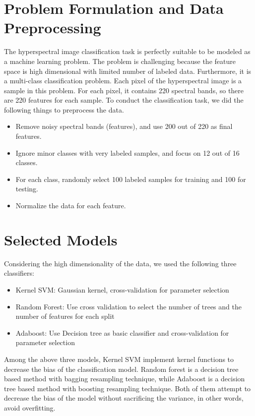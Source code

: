 \documentclass[11pt]{article}
\begin{document}
\section{Problem Formulation and Data Preprocessing}

The hyperspectral image classification task is perfectly suitable to be modeled as a machine learning problem. The problem is challenging because the feature space is high dimensional with limited number of labeled data. Furthermore, it is a multi-class classification problem. Each pixel of the hyperspectral image is a sample in this problem. For each pixel, it contains 220 spectral bands, so there are 220 features for each sample. To conduct the classification task, we did the following things to preprocess the data.

\begin{itemize}
  \item Remove noisy spectral bands (features), and use 200 out of 220 as final features.
  \item Ignore minor classes with very labeled samples, and focus on 12 out of 16 classes.
  \item For each class, randomly select 100 labeled samples for training and 100 for testing.
  \item Normalize the data for each feature.
\end{itemize}

\section{Selected Models}

Considering the high dimensionality of the data, we used the following three classifiers:

\begin{itemize}
  \item Kernel SVM: Gaussian kernel, cross-validation for parameter selection
  \item Random Forest: Use cross validation to select the number of trees and the number of features for each split
  \item Adaboost: Use Decision tree as basic classifier and cross-validation for parameter selection
\end{itemize}


   Among the above three models, Kernel SVM implement kernel functions to decrease the bias of the classification model. Random forest is a decision tree based method with bagging resampling technique, while Adaboost is a decision tree based method with boosting resampling technique. Both of them attempt to decrease the bias of the model without sacrificing the variance, in other words, avoid overfitting. 
   
\end{document}
